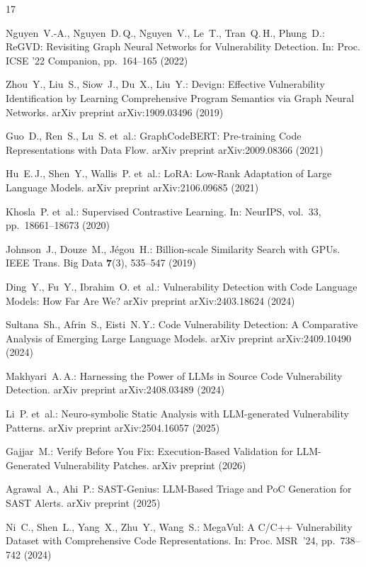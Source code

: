 \documentclass[runningheads]{llncs}
\begin{document}
\begin{thebibliography}{17}

Nguyen~V.-A., Nguyen~D.\,Q., Nguyen~V., Le~T., Tran~Q.\,H., Phung~D.:
ReGVD: Revisiting Graph Neural Networks for Vulnerability Detection.
In: Proc. ICSE '22 Companion, pp.~164--165 (2022)

Zhou~Y., Liu~S., Siow~J., Du~X., Liu~Y.:
Devign: Effective Vulnerability Identification by Learning Comprehensive Program Semantics via Graph Neural Networks.
arXiv preprint arXiv:1909.03496 (2019)

Guo~D., Ren~S., Lu~S. et~al.:
GraphCodeBERT: Pre-training Code Representations with Data Flow.
arXiv preprint arXiv:2009.08366 (2021)

Hu~E.\,J., Shen~Y., Wallis~P. et~al.:
LoRA: Low-Rank Adaptation of Large Language Models.
arXiv preprint arXiv:2106.09685 (2021)

Khosla~P. et~al.:
Supervised Contrastive Learning.
In: NeurIPS, vol.~33, pp.~18661--18673 (2020)

Johnson~J., Douze~M., J\'{e}gou~H.:
Billion-scale Similarity Search with GPUs.
IEEE Trans. Big Data \textbf{7}(3), 535--547 (2019)

Ding~Y., Fu~Y., Ibrahim~O. et~al.:
Vulnerability Detection with Code Language Models: How Far Are We?
arXiv preprint arXiv:2403.18624 (2024)

Sultana~Sh., Afrin~S., Eisti~N.\,Y.:
Code Vulnerability Detection: A Comparative Analysis of Emerging Large Language Models.
arXiv preprint arXiv:2409.10490 (2024)

Makhyari~A.\,A.:
Harnessing the Power of LLMs in Source Code Vulnerability Detection.
arXiv preprint arXiv:2408.03489 (2024)

Li~P. et~al.:
Neuro-symbolic Static Analysis with LLM-generated Vulnerability Patterns.
arXiv preprint arXiv:2504.16057 (2025)

Gajjar~M.:
Verify Before You Fix: Execution-Based Validation for LLM-Generated Vulnerability Patches.
arXiv preprint (2026)

Agrawal~A., Ahi~P.:
SAST-Genius: LLM-Based Triage and PoC Generation for SAST Alerts.
arXiv preprint (2025)

Ni~C., Shen~L., Yang~X., Zhu~Y., Wang~S.:
MegaVul: A C/C++ Vulnerability Dataset with Comprehensive Code Representations.
In: Proc. MSR~'24, pp.~738--742 (2024)


\end{thebibliography}
\end{document}
